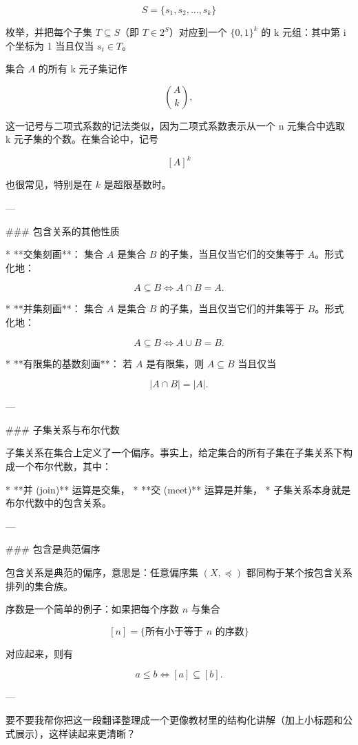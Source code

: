 $$
S = \{s_{1}, s_{2}, \ldots, s_{k}\}
$$

枚举，并把每个子集 $T \subseteq S$（即 $T \in 2^{S}$）对应到一个 $\{0,1\}^{k}$ 的 k 元组：其中第 i 个坐标为 1 当且仅当 $s_i \in T$。

集合 $A$ 的所有 k 元子集记作

$$
\binom{A}{k},
$$

这一记号与二项式系数的记法类似，因为二项式系数表示从一个 n 元集合中选取 k 元子集的个数。在集合论中，记号

$$
[A]^k
$$

也很常见，特别是在 $k$ 是超限基数时。

---

### 包含关系的其他性质

* **交集刻画**：
  集合 $A$ 是集合 $B$ 的子集，当且仅当它们的交集等于 $A$。形式化地：

$$
A \subseteq B \iff A \cap B = A.
$$

* **并集刻画**：
  集合 $A$ 是集合 $B$ 的子集，当且仅当它们的并集等于 $B$。形式化地：

$$
A \subseteq B \iff A \cup B = B.
$$

* **有限集的基数刻画**：
  若 $A$ 是有限集，则 $A \subseteq B$ 当且仅当

$$
|A \cap B| = |A|.
$$

---

### 子集关系与布尔代数

子集关系在集合上定义了一个偏序。事实上，给定集合的所有子集在子集关系下构成一个布尔代数，其中：

* **并 (join)** 运算是交集，
* **交 (meet)** 运算是并集，
* 子集关系本身就是布尔代数中的包含关系。

---

### 包含是典范偏序

包含关系是典范的偏序，意思是：任意偏序集 $(X, \preceq)$ 都同构于某个按包含关系排列的集合族。

序数是一个简单的例子：如果把每个序数 $n$ 与集合

$$
[n] = \{ \text{所有小于等于 } n \text{ 的序数} \}
$$

对应起来，则有

$$
a \leq b \iff [a] \subseteq [b].
$$

---

要不要我帮你把这一段翻译整理成一个更像教材里的结构化讲解（加上小标题和公式展示），这样读起来更清晰？
